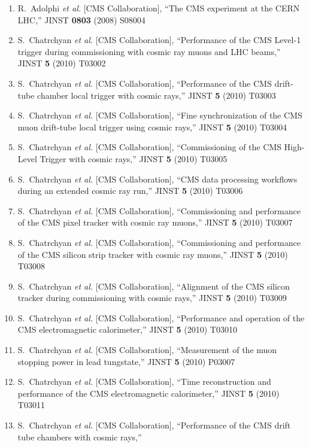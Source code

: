 \documentclass[10pt]{letter}
\begin{document}
\begin{enumerate}
\item R.~Adolphi {\it et al.}  [CMS Collaboration],
  ``The CMS experiment at the CERN LHC,''
  JINST {\bf 0803} (2008) S08004
\item S.~Chatrchyan {\it et al.}  [CMS Collaboration],
  ``Performance of the CMS Level-1 trigger during commissioning with cosmic ray muons and LHC beams,''
  JINST {\bf 5} (2010) T03002
\item S.~Chatrchyan {\it et al.}  [CMS Collaboration],
  ``Performance of the CMS drift-tube chamber local trigger with cosmic rays,''
  JINST {\bf 5} (2010) T03003
\item S.~Chatrchyan {\it et al.}  [CMS Collaboration],
  ``Fine synchronization of the CMS muon drift-tube local trigger using cosmic rays,''
  JINST {\bf 5} (2010) T03004
\item S.~Chatrchyan {\it et al.}  [CMS Collaboration],
  ``Commissioning of the CMS High-Level Trigger with cosmic rays,''
  JINST {\bf 5} (2010) T03005
\item S.~Chatrchyan {\it et al.}  [CMS Collaboration],
  ``CMS data processing workflows during an extended cosmic ray run,''
  JINST {\bf 5} (2010) T03006
\item S.~Chatrchyan {\it et al.}  [CMS Collaboration],
  ``Commissioning and performance of the CMS pixel tracker with cosmic ray muons,''
  JINST {\bf 5} (2010) T03007
\item S.~Chatrchyan {\it et al.}  [CMS Collaboration],
  ``Commissioning and performance of the CMS silicon strip tracker with cosmic ray muons,''
  JINST {\bf 5} (2010) T03008
\item S.~Chatrchyan {\it et al.}  [CMS Collaboration],
  ``Alignment of the CMS silicon tracker during commissioning with cosmic rays,''
  JINST {\bf 5} (2010) T03009
\item S.~Chatrchyan {\it et al.}  [CMS Collaboration],
  ``Performance and operation of the CMS electromagnetic calorimeter,''
  JINST {\bf 5} (2010) T03010
\item S.~Chatrchyan {\it et al.}  [CMS Collaboration],
  ``Measurement of the muon stopping power in lead tungstate,''
  JINST {\bf 5} (2010) P03007
\item S.~Chatrchyan {\it et al.}  [CMS Collaboration],
  ``Time reconstruction and performance of the CMS electromagnetic calorimeter,''
  JINST {\bf 5} (2010) T03011
\item S.~Chatrchyan {\it et al.}  [CMS Collaboration],
  ``Performance of the CMS drift tube chambers with cosmic rays,''

\end{enumerate}
\end{document}
